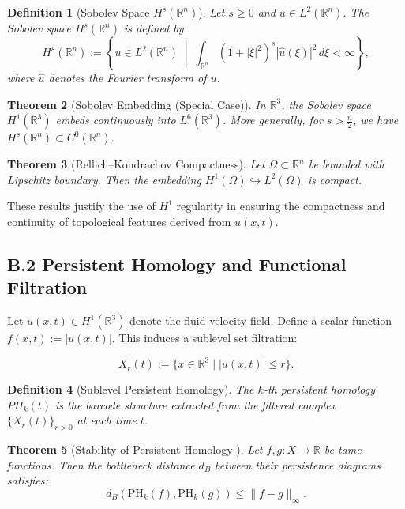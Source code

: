 \documentclass[11pt]{article}
\newtheorem{theorem}{Theorem}[section]
\newtheorem{definition}[theorem]{Definition}
\begin{document}
\begin{definition}[Sobolev Space $H^s(\mathbb{R}^n)$]
Let $s \geq 0$ and $u \in L^2(\mathbb{R}^n)$. The Sobolev space $H^s(\mathbb{R}^n)$ is defined by
\[
H^s(\mathbb{R}^n) := \left\{ u \in L^2(\mathbb{R}^n) \;\middle|\; \int_{\mathbb{R}^n} (1 + |\xi|^2)^s |\widehat{u}(\xi)|^2 \, d\xi < \infty \right\},
\]
where $\widehat{u}$ denotes the Fourier transform of $u$.
\end{definition}

\begin{theorem}[Sobolev Embedding (Special Case)]
In $\mathbb{R}^3$, the Sobolev space $H^1(\mathbb{R}^3)$ embeds continuously into $L^6(\mathbb{R}^3)$.  
More generally, for $s > \frac{n}{2}$, we have $H^s(\mathbb{R}^n) \subset C^0(\mathbb{R}^n)$.
\end{theorem}

\begin{theorem}[Rellich–Kondrachov Compactness]
Let $\Omega \subset \mathbb{R}^n$ be bounded with Lipschitz boundary. Then the embedding $H^1(\Omega) \hookrightarrow L^2(\Omega)$ is compact.
\end{theorem}

These results justify the use of $H^1$ regularity in ensuring the compactness and continuity of topological features derived from $u(x,t)$.

\subsection*{B.2 Persistent Homology and Functional Filtration}

Let $u(x,t) \in H^1(\mathbb{R}^3)$ denote the fluid velocity field. Define a scalar function $f(x,t) := |u(x,t)|$. This induces a sublevel set filtration:

\[
X_r(t) := \{ x \in \mathbb{R}^3 \mid |u(x,t)| \leq r \}.
\]

\begin{definition}[Sublevel Persistent Homology]
The $k$-th persistent homology $PH_k(t)$ is the barcode structure extracted from the filtered complex $\{ X_r(t) \}_{r > 0}$ at each time $t$.
\end{definition}

\begin{theorem}[Stability of Persistent Homology {\cite{CohenSteiner2007}}]
Let $f, g: X \to \mathbb{R}$ be tame functions. Then the bottleneck distance $d_B$ between their persistence diagrams satisfies:
\[
d_B(\mathrm{PH}_k(f), \mathrm{PH}_k(g)) \leq \|f - g\|_\infty.
\]
\end{theorem}
\end{document}
